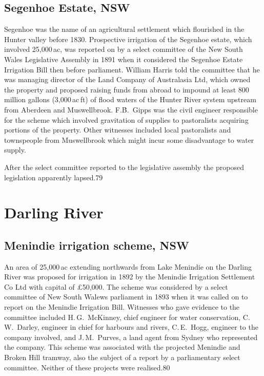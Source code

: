 \subsection{Segenhoe Estate, NSW}

Segenhoe was the name of an agricultural settlement which flourished
in the Hunter valley before 1830.  Prospective irrigation of the
Segenhoe estate, which involved 25,000\,ac, was reported on by a
select committee of the New South Wales Legislative Assembly in 1891
when it considered the Segenhoe Estate Irrigation Bill then before
parliament.  William Harris told the committee that he was managing
director of the Land Company of Australasia Ltd, which owned the
property and proposed raising funds from abroad to impound at least
800 million gallons (3,000\,ac\,ft) of flood waters of the Hunter
River system upstream from Aberdeen and Muswellbrook.  F.\.B.~Gipps
was the civil engineer responsible for the scheme which involved
gravitation of supplies to pastoralists acquiring portions of the
property.  Other witnesses included local pastoralists and townspeople
from Muswellbrook which might incur some disadvantage to water supply.

After the select committee reported to the legislative assembly the
proposed legislation apparently lapsed.79

\section{Darling River}

\subsection{Menindie irrigation scheme, NSW}

An area of 25,000\,ac extending northwards from Lake Menindie on the
Darling River was proposed for irrigation in 1892 by the Menindie
Irrigation Settlement Co Ltd with capital of \pounds50,000.  The
scheme was considered by a select committee of New South Walews
parliament in 1893 when it was called on to report on the Menindie
Irrigation Bill.  Witnesses who gave evidence to the committee
included H.\,G.~McKinney, chief engineer for water conservation,
C.\,W.~Darley, engineer in chief for harbours and rivers, C.\,E.~Hogg,
engineer to the company involved, and J.\,M.~Purves, a land agent from
Sydney who represented the company.  This scheme was associated with
the projected Menindie and Broken Hill tramway, also the subject of a
report by a parliamentary select committee.  Neither of these projects
were realised.80

